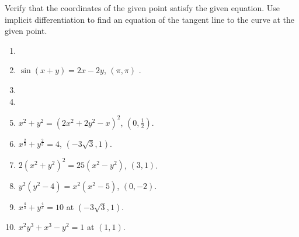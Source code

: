 Verify that the coordinates of the given point satisfy the given equation. Use implicit differentiation to find an equation of the tangent line to the curve at the given point. 
\begin{multicols}{3}
\begin{enumerate}[ref={\fcProblemRef}]
\item 

\item $ \sin (x+y)=2x-2y$, $(\pi,\pi)$ . 

\item 

\item  

\item $x^2+y^2=(2x^2+2y^2-x)^2 $, $(0,\frac{1}{2})$. 

\item $x^{\frac{2}{3}}+y^{\frac{2}{3}}=4$, $(-3\sqrt{3},1)$. 

\item $2(x^2+y^2)^2 =25(x^2-y^2)$, $(3,1)$. 

\item $y^2(y^2-4)=x^2(x^2-5) $, $(0,-2)$. 

\item $x^{\frac{4}{3}}+y^{\frac{4}{3}}=10$ at $(-3\sqrt{3}, 1)$. 

\item $x^2y^3+x^3-y^2=1$ at $(1,1)$. 

\end{enumerate}
\end{multicols}

